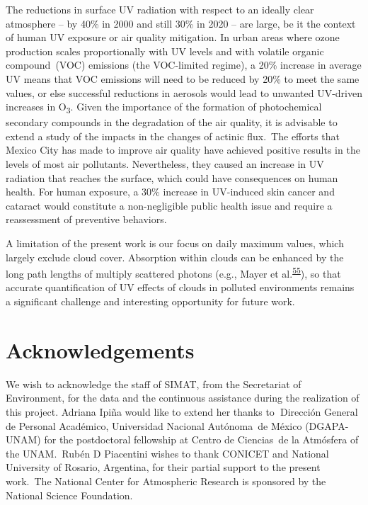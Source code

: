 \documentclass[10pt]{article}
\begin{document}
The reductions in surface UV radiation with respect to an ideally clear
atmosphere -- by 40\% in 2000 and still 30\% in 2020 -- are large, be it
the context of human UV exposure or air quality mitigation. In urban
areas where ozone production scales proportionally with UV levels and
with volatile organic compound~(VOC) emissions (the VOC-limited regime),
a 20\% increase in average UV means that VOC emissions will need to be
reduced by 20\% to meet the same values, or else successful reductions
in aerosols would lead to unwanted UV-driven increases in
O\textsubscript{3}. Given the importance of the formation of
photochemical secondary compounds in the degradation of the air quality,
it is advisable to extend a study of the impacts in the changes of
actinic flux.~The efforts that Mexico City has made to improve air
quality have achieved positive results in the levels of most air
pollutants. Nevertheless, they caused an increase in UV radiation that
reaches the surface, which could have consequences on human health. For
human exposure, a 30\% increase in UV-induced skin cancer and cataract
would constitute a non-negligible public health issue and require a
reassessment of preventive behaviors. ~

A limitation of the present work is our focus on daily maximum values,
which largely exclude cloud cover. Absorption within clouds can be
enhanced by the long path lengths of multiply scattered photons (e.g.,
Mayer et al.\textsuperscript{\hyperref[csl:55]{55}}), so that accurate quantification of UV
effects of clouds in polluted environments remains a significant
challenge and interesting opportunity for future work.~

\section*{Acknowledgements}\label{acknowledgements}

We wish to acknowledge the staff of SIMAT, from the Secretariat of
Environment, for the data and the continuous assistance during the
realization of this project. Adriana Ipiña would like to extend her
thanks to\textbf{~}Dirección General de Personal Académico, Universidad
Nacional Autónoma~de México (DGAPA-UNAM) for the postdoctoral fellowship
at Centro de Ciencias~de la Atmósfera of the UNAM.~Rubén D Piacentini
wishes to thank CONICET and National University of Rosario, Argentina,
for their partial support to the present work.~The National Center for
Atmospheric Research is sponsored by the National Science Foundation.
\end{document}
